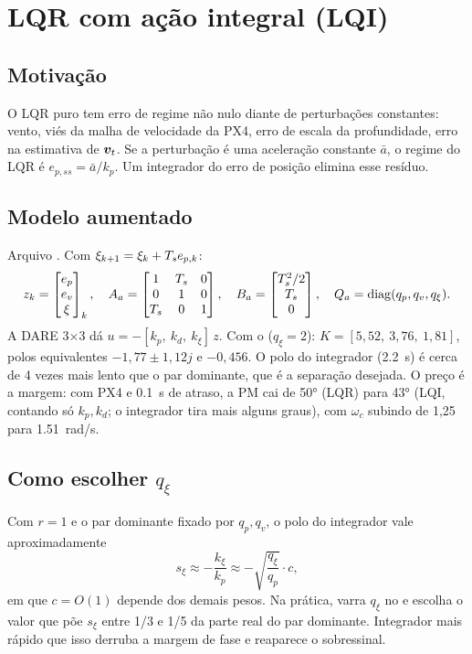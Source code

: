 \chapter{LQR com ação integral (LQI)}
\label{cap:lqi}

\section{Motivação}
O LQR puro tem erro de regime não nulo diante de perturbações constantes: vento, viés
da malha de velocidade da PX4, erro de escala da profundidade, erro na estimativa de
$\bm{v}_t$. Se a perturbação é uma aceleração constante $\bar a$, o regime do LQR é
$e_{p,ss} = \bar a/k_p$. Um integrador do erro de posição elimina esse resíduo.

\section{Modelo aumentado}
Arquivo . Com $\xi_{k+1}=\xi_k+T_s e_{p,k}$:
\begin{equation}
  z_k=\begin{bmatrix}e_p\\e_v\\ \xi\end{bmatrix}_k,\quad
  A_a=\begin{bmatrix}1&T_s&0\\0&1&0\\ T_s&0&1\end{bmatrix},\quad
  B_a=\begin{bmatrix}T_s^2/2\\ T_s\\ 0\end{bmatrix},\quad
  Q_a=\mathrm{diag}(q_p,q_v,q_\xi).
\end{equation}
A DARE 3$\times$3 dá $u=-[k_p,\ k_d,\ k_\xi]\,z$. Com o  ($q_\xi=2$):
$K=[5{,}52,\ 3{,}76,\ 1{,}81]$, polos equivalentes $-1{,}77\pm1{,}12j$ e $-0{,}456$. O
polo do integrador (\SI{2,2}{s}) é cerca de 4 vezes mais lento que o par dominante,
que é a separação desejada. O preço é a margem: com PX4 e \SI{0,1}{s} de atraso, a PM
cai de \ang{50} (LQR) para \ang{43} (LQI, contando só $k_p,k_d$; o integrador tira mais alguns graus), com $\omega_c$ subindo de 1,25 para
\SI{1,51}{rad/s}.

\section{Como escolher $q_\xi$}
Com $r=1$ e o par dominante fixado por $q_p,q_v$, o polo do integrador vale
aproximadamente
\begin{equation}
  s_\xi \approx -\frac{k_\xi}{k_p} \approx -\sqrt{\frac{q_\xi}{q_p}}\cdot c,
\end{equation}
em que $c=O(1)$ depende dos demais pesos. Na prática, varra $q_\xi$ no
 e escolha o valor que põe $s_\xi$ entre 1/3 e 1/5 da parte real
do par dominante. Integrador mais rápido que isso derruba a margem de fase e reaparece
o sobressinal.

